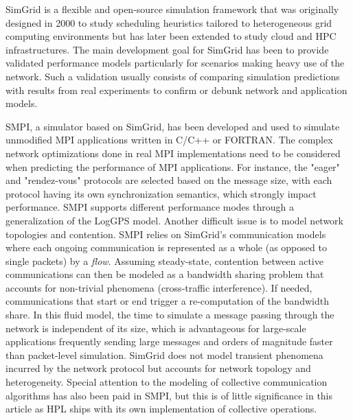         SimGrid\cite{simgrid} is a flexible and open-source simulation framework that was originally designed in 2000 to
        study scheduling heuristics tailored to heterogeneous grid computing environments but has later been extended to
        study cloud and HPC infrastructures. The main development goal for SimGrid has been to provide validated performance
        models particularly for scenarios making heavy use of the network.  Such a validation usually consists of comparing
        simulation predictions with results from real experiments to confirm or debunk network and application models.

        SMPI, a simulator based on SimGrid, has been developed and used to simulate unmodified MPI applications written in
        C/C++ or FORTRAN\cite{smpi}.
        The complex network optimizations done in real MPI implementations need to be considered when predicting the
        performance of MPI applications.  For instance, the "eager" and "rendez-vous" protocols are selected based on the
        message size, with each protocol having its own synchronization semantics, which strongly impact performance.  SMPI
        supports different performance modes through a generalization of the LogGPS model.  Another difficult issue is to
        model network topologies and contention. SMPI relies on SimGrid's communication models where each ongoing
        communication is represented as a whole (as opposed to single packets) by a \emph{flow}. Assuming steady-state,
        contention between active communications can then be modeled as a bandwidth sharing problem that accounts for
        non-trivial phenomena (\eg cross-traffic interference\cite{Velho_TOMACS13}). If needed, communications that start or
        end trigger a re-computation of the bandwidth share.  In this fluid model, the time to simulate a message passing
        through the network is independent of its size, which is advantageous for large-scale applications frequently
        sending large messages and orders of magnitude faster than packet-level simulation.  SimGrid does not model
        transient phenomena incurred by the network protocol but accounts for network topology and heterogeneity. Special
        attention to the modeling of collective communication algorithms has also been paid in SMPI, but this is of little
        significance in this article as HPL ships with its own implementation of collective operations.

